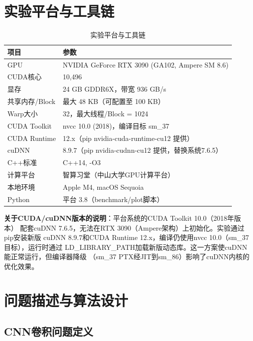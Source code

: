 \documentclass[UTF8,a4paper,12pt,fontset=none]{ctexart}
\begin{document}
\section{实验平台与工具链}

\begin{table}[H]
  \centering
  \caption{实验平台与工具链}
  \label{tab:platform}
  \begin{tabular}{ll}
    \toprule
    项目 & 参数 \\
    \midrule
    GPU & NVIDIA GeForce RTX 3090 (GA102, Ampere SM 8.6) \\
    CUDA核心 & 10,496 \\
    显存 & 24 GB GDDR6X，带宽 936 GB/s \\
    共享内存/Block & 最大 48 KB（可配置至 100 KB） \\
    Warp大小 & 32，最大线程/Block = 1024 \\
    \midrule
    CUDA Toolkit & nvcc 10.0 (2018)，编译目标 sm\_37 \\
    CUDA Runtime & 12.x（pip nvidia-cuda-runtime-cu12 提供） \\
    cuDNN & 8.9.7（pip nvidia-cudnn-cu12 提供，替换系统7.6.5） \\
    C++标准 & C++14, -O3 \\
    \midrule
    计算平台 & 智算习堂（中山大学GPU计算平台） \\
    本地环境 & Apple M4, macOS Sequoia \\
    Python & 平台 3.8（benchmark/plot脚本） \\
    \bottomrule
  \end{tabular}
\end{table}

\textbf{关于CUDA/cuDNN版本的说明}：平台系统的CUDA Toolkit 10.0（2018年版本）
配套cuDNN 7.6.5，无法在RTX 3090（Ampere架构）上初始化。实验通过pip安装新版
cuDNN 8.9.7和CUDA Runtime 12.x，编译仍使用nvcc 10.0（sm\_37目标），运行时通过
LD\_LIBRARY\_PATH加载新版动态库。这一方案使cuDNN能正常运行，但编译器降级
（sm\_37 PTX经JIT到sm\_86）影响了cuDNN内核的优化效果。

\section{问题描述与算法设计}

\subsection{CNN卷积问题定义}
\end{document}
